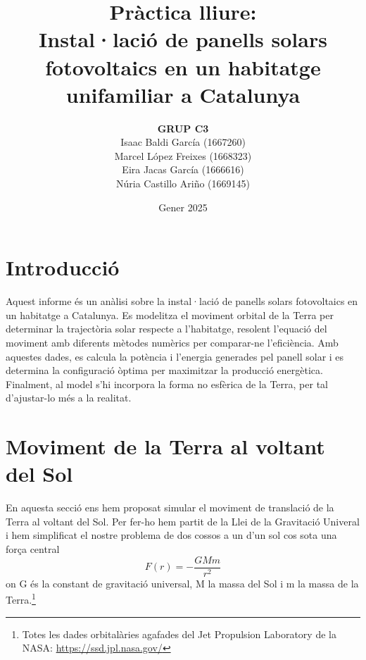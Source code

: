 \documentclass[11pt]{article}
\title{\Huge\bfseries Pràctica lliure: \\ Instal·lació de panells solars fotovoltaics en un habitatge unifamiliar a Catalunya \\ [2ex] \Large}
\author{\begin{tabular}{c}
\textbf{GRUP C3} \\
Isaac Baldi García (1667260)\\
Marcel López Freixes (1668323) \\
Eira Jacas García (1666616) \\
Núria Castillo Ariño (1669145)
\end{tabular}}
\date{Gener 2025}
\begin{document}
\maketitle


\newpage

\tableofcontents
\newpage

\section{Introducció}
Aquest informe és un anàlisi sobre la instal·lació de panells solars fotovoltaics en un habitatge a Catalunya. Es modelitza el moviment orbital de la Terra per determinar la trajectòria solar respecte a l’habitatge, resolent l’equació del moviment amb diferents mètodes numèrics per comparar-ne l’eficiència. Amb aquestes dades, es calcula la potència i l’energia generades pel panell solar i es determina la configuració òptima per maximitzar la producció energètica. Finalment, al model s'hi incorpora la forma no esfèrica de la Terra, per tal d'ajustar-lo més a la realitat.
\section{Moviment de la Terra al voltant del Sol} \label{sec: seccio_1}
En aquesta secció ens hem proposat simular el moviment de translació de la Terra al voltant del Sol. Per fer-ho hem partit de la Llei de la Gravitació Univeral i hem simplificat el nostre problema de dos cossos a un d'un sol cos sota una força central
\begin{equation}
    F(r)=-\frac{GMm}{r^2}
    \label{si}
\end{equation}
on G és la constant de gravitació universal, M la massa del Sol i m la massa de la Terra.\footnote{Totes les dades orbitalàries agafades del Jet Propulsion Laboratory de la NASA: \url{https://ssd.jpl.nasa.gov/}}
\end{document}
